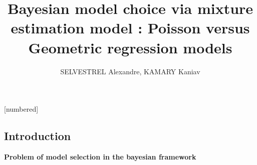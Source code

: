 \documentclass{beamer}
\author{SELVESTREL Alexandre, KAMARY Kaniav}
\title{Bayesian model choice via mixture estimation model : Poisson versus Geometric regression models}
\date{}
\begin{document}
[numbered]

\begin{frame}
\titlepage
\end{frame}

\begin{frame}
\tableofcontents
\end{frame}

\begin{frame}
\nocite{kamary2018testing}
\section{Introduction}
\nocite{kamary2018testing}
\begin{center}
\textbf{Problem of model selection in the bayesian framework}\\[10 pt]



\end{center}
\end{frame}
\end{document}
